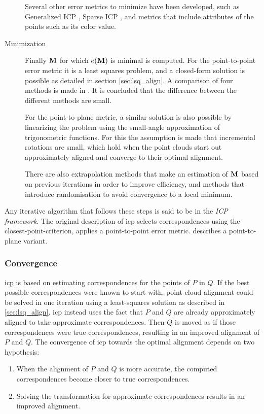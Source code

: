 \begin{description}
Several other error metrics to minimize have been developed, such as Generalized ICP \cite{Sega2009}, Sparse ICP \cite{Boua2013}, and metrics that include attributes of the points such as its color value.

\item[Minimization] Finally $\mathbf{M}$ for which $e(\mathbf{M})$ is minimal is computed. For the point-to-point error metric it is a least squares problem, and a closed-form solution is possible as detailed in section \ref{sec:lsq_align}. A comparison of four methods is made in \cite{Loru1995}. It is concluded that the difference between the different methods are small.

For the point-to-plane metric, a similar solution is also possible by linearizing the problem using the small-angle approximation of trigonometric functions. \cite{Chen1991} For this the assumption is made that incremental rotations are small, which hold when the point clouds start out approximately aligned and converge to their optimal alignment.

There are also extrapolation methods that make an estimation of $\mathbf{M}$ based on previous iterations in order to improve efficiency, and methods that introduce randomisation to avoid convergence to a local minimum. \cite{Rusi2001}
\end{description}

Any iterative algorithm that follows these steps is said to be in the \emph{ICP framework}. The original description \cite{Besl1992} of \gls{icp} selects correspondences using the closest-point-criterion, applies a point-to-point error metric. \cite{Chen1991} describes a point-to-plane variant.


\subsubsection{Convergence}
\gls{icp} is based on estimating correspondences for the points of $P$ in $Q$. If the best possible correspondences were known to start with, point cloud alignment could be solved in one iteration using a least-squares solution as described in \ref{sec:lsq_align}. \gls{icp} instead uses the fact that $P$ and $Q$ are already approximately aligned to take approximate correspondences. Then $Q$ is moved as if those correspondences were true correspondences, resulting in an improved alignment of $P$ and $Q$.  The convergence of \gls{icp} towards the optimal alignment depends on two hypothesis:

\begin{enumerate}
\item When the alignment of $P$ and $Q$ is more accurate, the computed correspondences become closer to true correspondences.
\item Solving the transformation for approximate correspondences results in an improved alignment.
\end{enumerate}


